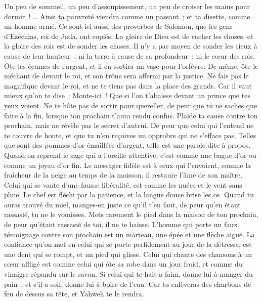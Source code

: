 \begin{multicols}{2}
Un peu de sommeil, un peu d'assoupissement, un peu de croiser les mains pour dormir~! …
Ainsi ta pauvreté viendra comme un passant~; et ta disette, comme un homme armé.
\VerseOne{}Ce sont ici aussi des proverbes de Salomon, que les gens d'Ezéchias, roi de Juda, ont copiés.
La gloire de Dieu est de cacher les choses, et la gloire des rois est de sonder les choses.
Il n'y a pas moyen de sonder les cieux à cause de leur hauteur~; ni la terre à cause de sa profondeur~; ni le cœur des rois.
Ôte les écumes de l'argent, et il en sortira un vase pour l'orfèvre.
 De même, ôte le méchant de devant le roi, et son trône sera affermi par la justice.
Ne fais pas le magnifique devant le roi, et ne te tiens pas dans la place des grands.
Car il vaut mieux qu'on te dise~: Monte-ici~! Que si l'on t'abaisse devant un prince que tes yeux voient.
Ne te hâte pas de sortir pour quereller, de peur que tu ne saches que faire à la fin, lorsque ton prochain t'aura rendu confus.
Plaide ta cause contre ton prochain, mais ne révèle pas le secret d'autrui.
De peur que celui qui l'entend ne te couvre de honte, et que tu n'en reçoives un opprobre qui ne s'efface pas.
Telles que sont des pommes d'or émaillées d'argent, telle est une parole dite à propos.
Quand on reprend le sage qui a l'oreille attentive, c'est comme une bague d'or ou comme un joyau d'or fin.
Le messager fidèle est à ceux qui l'envoient, comme la fraîcheur de la neige au temps de la moisson, il restaure l'âme de son maître.
Celui qui se vante d'une fausse libéralité, est comme les nuées et le vent sans pluie.
Le chef est fléchi par la patience, et la langue douce brise les os.
Quand tu auras trouvé du miel, manges-en juste ce qu'il t'en faut, de peur qu'en étant rassasié, tu ne le vomisses.
Mets rarement le pied dans la maison de ton prochain, de peur qu'étant rassasié de toi, il ne te haïsse.
L'homme qui porte un faux témoignage contre son prochain est un marteau, une épée et une flèche aiguë.
La confiance qu'on met en celui qui se porte perfidement au jour de la détresse, est une dent qui se rompt, et un pied qui glisse.
Celui qui chante des chansons à un cœur affligé est comme celui qui ôte sa robe dans un jour froid, et comme du vinaigre répandu sur le savon.
Si celui qui te hait a faim, donne-lui à manger du pain~; et s'il a soif, donne-lui à boire de l'eau.
Car tu enlèveras des charbons de feu de dessus sa tête, et Yahweh te le rendra.

\end{multicols}
